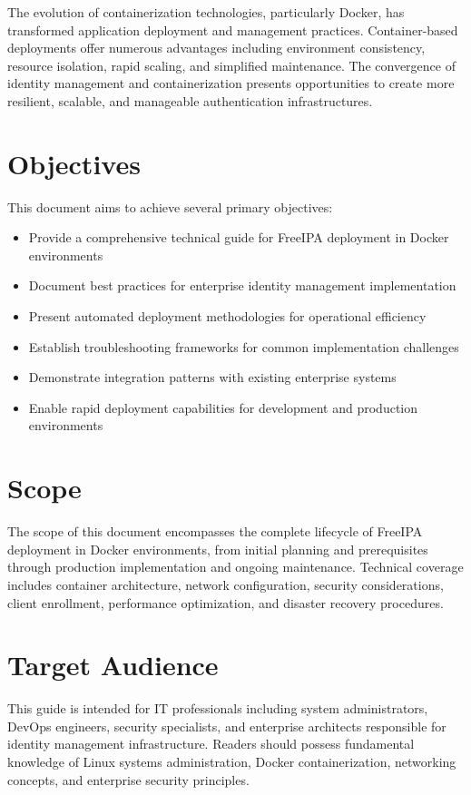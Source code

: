 \documentclass[12pt,a4paper]{report}
\begin{document}
The evolution of containerization technologies, particularly Docker, has transformed application deployment and management practices. Container-based deployments offer numerous advantages including environment consistency, resource isolation, rapid scaling, and simplified maintenance. The convergence of identity management and containerization presents opportunities to create more resilient, scalable, and manageable authentication infrastructures.

\section{Objectives}

This document aims to achieve several primary objectives:

\begin{itemize}
    \item Provide a comprehensive technical guide for FreeIPA deployment in Docker environments
    \item Document best practices for enterprise identity management implementation
    \item Present automated deployment methodologies for operational efficiency
    \item Establish troubleshooting frameworks for common implementation challenges
    \item Demonstrate integration patterns with existing enterprise systems
    \item Enable rapid deployment capabilities for development and production environments
\end{itemize}

\section{Scope}

The scope of this document encompasses the complete lifecycle of FreeIPA deployment in Docker environments, from initial planning and prerequisites through production implementation and ongoing maintenance. Technical coverage includes container architecture, network configuration, security considerations, client enrollment, performance optimization, and disaster recovery procedures.

\section{Target Audience}

This guide is intended for IT professionals including system administrators, DevOps engineers, security specialists, and enterprise architects responsible for identity management infrastructure. Readers should possess fundamental knowledge of Linux systems administration, Docker containerization, networking concepts, and enterprise security principles.
\end{document}
